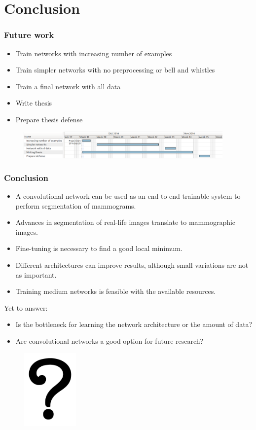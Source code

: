 \documentclass{beamer}
\begin{document}
	
	\section[Conclusion]{Conclusion}
	\begin{frame}
		\frametitle{Future work}
		\begin{itemize}
			\item Train networks with increasing number of examples
			\item Train simpler networks with no preprocessing or bell and whistles
			\item Train a final network with all data
			\item Write thesis
			\item Prepare thesis defense
		\end{itemize}
		\begin{figure}
			\includegraphics[width=0.95\textwidth]{plots/workplan.png}
		\end{figure}
	\end{frame}
	
	\begin{frame}
		\frametitle{Conclusion}
		\begin{itemize}
			\item A convolutional network can be used as an end-to-end trainable system to perform segmentation of mammograms.
			\item Advances in segmentation of real-life images translate to mammographic images. 
			\item Fine-tuning is necessary to find a good local minimum.
			\item Different architectures can improve results, although small variations are not as important.
			\item Training medium networks is feasible with the available resources.
		\end{itemize}
		Yet to answer:
		\begin{itemize}
			\item Is the bottleneck for learning the network architecture or the amount of data?
			\item Are convolutional networks a good option for future research?
		\end{itemize}
	\end{frame}

	\begin{frame}[c]
		\begin{center}
			\begin{figure}
				\includegraphics[width=0.25\textwidth]{plots/questions.png}
			\end{figure}
		\end{center}
	\end{frame}
\end{document}
